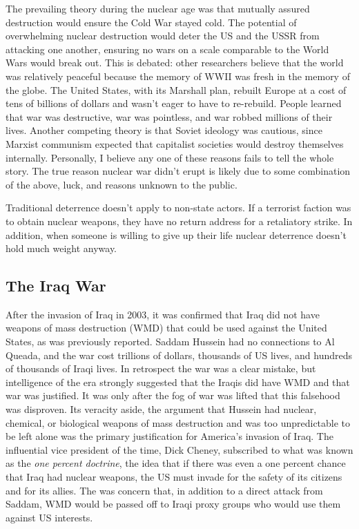 \documentclass[nobib]{tufte-handout}
\begin{document}
The prevailing theory during the nuclear age 
was that mutually assured destruction would 
ensure the Cold War stayed cold. The potential 
of overwhelming nuclear destruction would deter 
the US and the USSR from attacking one another, 
ensuring no wars on a scale comparable to the 
World Wars would break out. This is debated:
other researchers believe that the world was 
relatively peaceful because the memory of WWII
was fresh in the memory of the globe. The United 
States, with its Marshall plan, rebuilt Europe 
at a cost of tens of billions of dollars and wasn't 
eager to have to re-rebuild. People learned 
that war was destructive, war was pointless, 
and war robbed millions of their lives. Another 
competing theory is that Soviet ideology was 
cautious, since Marxist communism expected 
that capitalist societies would destroy themselves 
internally. Personally, I believe any 
one of these reasons fails to tell the whole story. 
The true reason nuclear war didn't erupt is 
likely due to some combination of the above, luck, 
and reasons unknown to the public. 

Traditional deterrence doesn't apply to non-state 
actors. If a terrorist faction was to obtain 
nuclear weapons, they have no return address 
for a retaliatory strike. In addition, when 
someone is willing to give up their life 
nuclear deterrence doesn't hold much weight 
anyway. 

\subsection{The Iraq War}

After the invasion of Iraq in 2003, it was confirmed that Iraq
did not have weapons of mass destruction (WMD) that could be used 
against the United States, as was previously reported. 
Saddam Hussein had no connections to Al Queada, and the war 
cost trillions of dollars, thousands of US lives, and hundreds 
of thousands of Iraqi lives. In retrospect the war was a clear 
mistake, but intelligence of the era strongly suggested that 
the Iraqis did have WMD and that war was justified. It was 
only after the fog of war was lifted that this falsehood was 
disproven. Its veracity aside, the argument that Hussein had nuclear, 
chemical, or biological weapons of mass destruction and was 
too unpredictable to be left alone was the primary justification 
for America's invasion of Iraq. The influential vice president 
of the time, Dick Cheney, subscribed to what was known as the 
\emph{one percent doctrine}, the idea that if there was even a 
one percent chance that Iraq had nuclear weapons, the US must
invade for the safety of its citizens and for its allies. The 
was concern that, in addition to a direct attack from Saddam, 
WMD would be passed off to Iraqi proxy groups who would use them
against US interests. 
\end{document}
